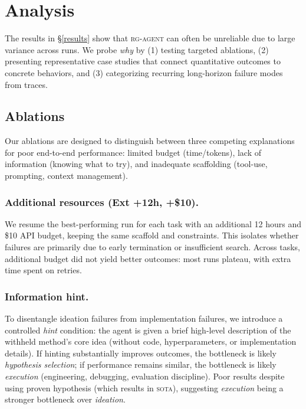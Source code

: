 \documentclass[11pt]{article}
\newcommand{\kw}[1]{{\textsc{\MakeLowercase{#1}}}}
\theoremstyle{plain}
\theoremstyle{definition}
\theoremstyle{remark}
\begin{document}
\section{Analysis} \label{sec:analysis}

The results in \S\ref{results} show that \kw{RG-Agent} can often be unreliable due to large variance across runs. 
We probe \emph{why} by (1) testing targeted ablations, (2) presenting representative case studies that connect quantitative outcomes to concrete behaviors, and (3) categorizing recurring long-horizon failure modes from traces.

\subsection{Ablations} \label{sec:ablations}

Our ablations are designed to distinguish between three competing explanations for poor end-to-end performance: limited budget (time/tokens), lack of information (knowing what to try), and inadequate scaffolding (tool-use, prompting, context management).

\subsubsection{Additional resources (Ext +12h, +\$10).}
We resume the best-performing run for each task with an additional 12 hours and \$10 API budget, keeping the same scaffold and constraints. This isolates whether failures are primarily due to early termination or insufficient search. Across tasks, additional budget did not yield better outcomes: most runs plateau, with extra time spent on retries.

\subsubsection{Information hint.} 
To disentangle ideation failures from implementation failures, we introduce a controlled \emph{hint} condition: the agent is given a brief high-level description of the withheld method's core idea (without code, hyperparameters, or implementation details). If hinting substantially improves outcomes, the bottleneck is likely \emph{hypothesis selection}; if performance remains similar, the bottleneck is likely \emph{execution} (engineering, debugging, evaluation discipline). Poor results despite using proven hypothesis (which results in \kw{SOTA}), suggesting \emph{execution} being a stronger bottleneck over \emph{ideation}.
\end{document}
